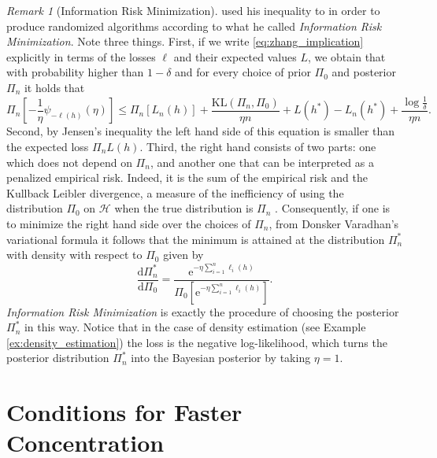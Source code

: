 \documentclass{uvamath}
\newcommand*{\calH}{\mathcal{H}}
\newcommand*{\sqbrack}[1]{\left[#1\right]}
\newcommand*{\rme}{\mathrm{e}}
\newcommand*{\rmd}{\mathrm{d}}
\newcommand*{\KL}{\mathrm{KL}}
\theoremstyle{remark}
\newtheorem{remark}[theorem]{Remark}
\theoremstyle{definition}
\theoremstyle{definition}
\theoremstyle{definition}
\theoremstyle{definition}
\theoremstyle{definition}
\begin{document}
\begin{remark}[Information Risk
  Minimization] \label{rem:information_risk_minimization}
  \citet{zhang_information-theoretic_2006} used his inequality to in
  order to produce randomized algorithms according to what he called
  \textit{Information Risk Minimization}. Note three things. First, if
  we write \eqref{eq:zhang_implication} explicitly in terms of the
  losses $\ell$ and their expected values $L$, we obtain that with
  probability higher than $1-\delta$ and for every choice of prior
  $\Pi_0$ and posterior $\Pi_n$ it holds that
  \begin{equation} \label{eq:information_risk_minimization}
    \Pi_n\sqbrack{-\frac{1}{\eta}\psi_{-\ell(h)}(\eta)}
    \leq \Pi_n\sqbrack{L_n(h)} + \frac{\KL(\Pi_n, \Pi_0) }{\eta n} +
    L(h^*) - L_n(h^*) +
    \frac{\log\frac{1}{\delta}}{\eta n}.
  \end{equation}
  Second, by Jensen's inequality the left hand side of this equation
  is smaller than the expected loss $\Pi_n L(h)$.  Third, the right
  hand consists of two parts: one which does not depend on $\Pi_n$,
  and another one that can be interpreted as a penalized empirical
  risk. Indeed, it is the sum of the empirical risk and the Kullback
  Leibler divergence, a measure of the inefficiency of using the
  distribution $\Pi_0$ on $\calH$ when the true distribution is
  $\Pi_n$ \citep[see][Section 2.3]{cover_elements_2006}. Consequently,
  if one is to minimize the right hand side over the choices of
  $\Pi_n$, from Donsker Varadhan's variational formula it follows that
  the minimum is attained at the distribution $\Pi_n^*$ with density
  with respect to $\Pi_0$ given by
  \begin{equation*} \frac{\rmd\Pi_{n}^*}{\rmd \Pi_0} =
    \frac{\rme^{-\eta \sum_{i=1}^n \ell_i(h)}}{\Pi_0[\rme^{-\eta
        \sum_{i=1}^n \ell_i(h)}]}.
  \end{equation*}
  \textit{Information Risk Minimization} is exactly the procedure of
  choosing the posterior $\Pi^*_n$ in this way. Notice that in the
  case of density estimation (see Example \ref{ex:density_estimation})
  the loss is the negative log-likelihood, which turns the posterior
  distribution $\Pi_n^*$ into the Bayesian posterior by taking
  $\eta = 1$.
\end{remark}




\section{Conditions for Faster Concentration \label{sect:conditions_fast}}
\end{document}
